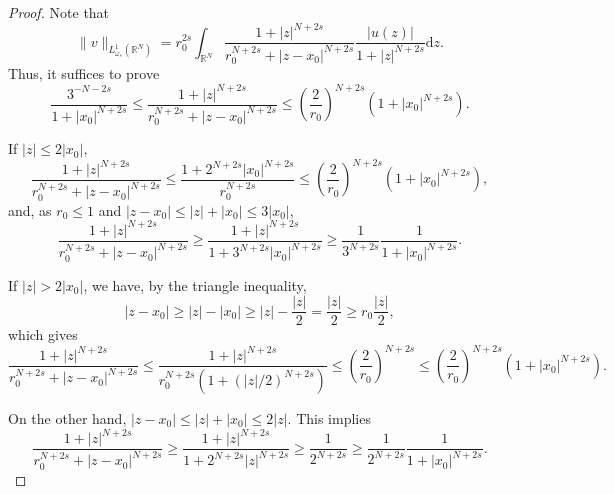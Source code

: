 \documentclass[a4paper,11pt]{article}
\newcommand{\R}{\mathbb{R}}
\newcommand{\Lomega}{L_{\omega_s}^1(\R^N)}
\newcommand{\dz}{\mathrm{d}z}
\begin{document}
\begin{proof}
	Note that
	\[\|v\|_{\Lomega} = r_0^{2s} \int_{\R^N} \frac{1 + |z|^{N+2s}}{r_0^{N+2s} + |z-x_0|^{N+2s}} \frac{|u(z)|}{1+|z|^{N+2s}}\dz.\]
	Thus, it suffices to prove
	\[\frac{3^{-N-2s}}{1+|x_0|^{N+2s}} \leq \frac{1 + |z|^{N+2s}}{r_0^{N+2s} + |z-x_0|^{N+2s}} \leq \left( \frac{2}{r_0}\right)^{N+2s} (1+|x_0|^{N+2s}).\]
	
	If $|z| \leq 2|x_0|$,
	\[\frac{1 + |z|^{N+2s}}{r_0^{N+2s} + |z - x_0|^{N+2s}} \leq \frac{1 + 2^{N+2s}|x_0|^{N+2s}}{r_0^{N+2s}} \leq \left( \frac{2}{r_0}\right)^{N+2s}(1+|x_0|^{N+2s}),\]
	and, as $r_0\leq 1$ and $|z-x_0| \leq |z| + |x_0| \leq 3|x_0|$,
	\[\frac{1 + |z|^{N+2s}}{r_0^{N+2s} + |z - x_0|^{N+2s}} \geq \frac{1 + |z|^{N+2s}}{1 + 3^{N+2s} |x_0|^{N+2s}} \geq \frac{1}{3^{N+2s}}\frac{1}{1+|x_0|^{N+2s}}.\]
	
	If $|z| > 2|x_0|$, we have, by the triangle inequality,
	\[|z-x_0| \geq |z| - |x_0| \geq |z| - \frac{|z|}{2} = \frac{|z|}{2} \geq r_0 \frac{|z|}{2},\]
	which gives
	\[\frac{1 + |z|^{N+2s}}{r_0^{N+2s} + |z - x_0|^{N+2s}} \leq  \frac{1 + |z|^{N+2s}}{r_0^{N + 2s} (1 + (|z|/2)^{N+2s})} \leq \left( \frac{2}{r_0}\right)^{N+2s} \leq \left( \frac{2}{r_0}\right)^{N+2s} ( 1+ |x_0|^{N+2s}).\]
	
	On the other hand, $|z-x_0| \leq |z| + |x_0| \leq 2|z|$. This implies
	\[\frac{1 + |z|^{N+2s}}{r_0^{N+2s} + |z - x_0|^{N+2s}} \geq \frac{1+|z|^{N+2s}}{1+2^{N+2s}|z|^{N+2s}} \geq \frac{1}{2^{N+2s}} \geq \frac{1}{2^{N+2s}} \frac{1}{1+ |x_0|^{N+2s}}.\]
\end{proof}
\end{document}
